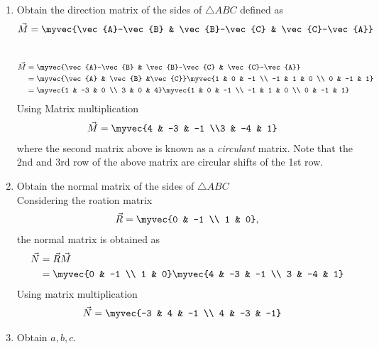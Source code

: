 \documentclass[11pt]{book}
\begin{document}
\begin{enumerate}[label=\thesubsection.\arabic*.,ref=\thesubsection.\theenumi]
\item Obtain the direction matrix of the sides of $\triangle ABC$ defined as 
\begin{align}
\vec{M} = 	\myvec{\vec{A}-\vec{B} & \vec{B}-\vec{C} & \vec{C}-\vec{A}}
\end{align}
\\
\solution 
\begin{align}
\vec{M} &= \myvec{\vec{A}-\vec{B} & \vec{B}-\vec{C} & \vec{C}-\vec{A}} \\
	&= \myvec{\vec{A} & \vec{B} &\vec{C}} \myvec{1 & 0 & -1 \\ -1 & 1 & 0 \\ 0 & -1 & 1} \\
 &=\myvec{1 & -3 & 0 \\ 3 & 0 & 4}\myvec{1 & 0 & -1 \\ -1 & 1 & 0 \\ 0 & -1 & 1} 
 \end{align}
 Using Matrix multiplication
 \begin{align}
 \vec{M} &=\myvec{4 & -3 & -1 \\3 & -4 & 1}
\end{align}
where the second matrix above is known as a {\em circulant} matrix.  Note that the 2nd and 3rd row of the above matrix are circular shifts of the 1st row.
\item Obtain the normal matrix  of the sides of $\triangle ABC$ \\
\solution Considering the roation matrix
\begin{align}
\vec{R}  = \myvec{0 & -1 \\ 1 & 0},
\end{align}
the normal matrix is obtained as
\begin{align}
\vec{N} &= \vec{R}\vec{M}  \\
&=\myvec{0 & -1 \\ 1 & 0}\myvec{4 & -3 & -1 \\ 3 & -4 & 1} 
\end{align}
Using matrix multiplication 
\begin{align}
   \vec{N} &= \myvec{-3 & 4 & -1 \\ 4 & -3 & -1}
\end{align}
\item Obtain $a, b, c$. \\

\end{enumerate}
\end{document}
